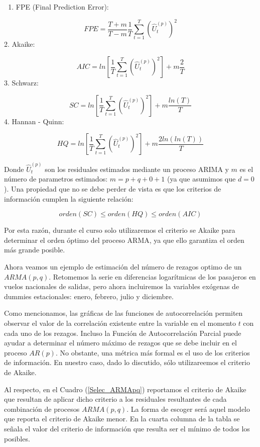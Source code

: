 \documentclass[
  a4paper,
]{article}
\providecommand{\tightlist}{%
  \setlength{\itemsep}{0pt}\setlength{\parskip}{0pt}}\usepackage{longtable,booktabs,array}
\begin{document}
\begin{enumerate}
\def\labelenumi{\arabic{enumi}.}
\tightlist
\item
  FPE (Final Prediction Error):
\end{enumerate}

\[
FPE = \frac{T+m}{T-m}\frac{1}{T}\sum_{t=1}^{T} \left( \hat{U}_t^{(p)} \right) ^2
\] 2. Akaike:

\[
AIC = ln \left[ \frac{1}{T} \sum_{t=1}^{T} \left( \hat{U}_t^{(p)} \right) ^2 \right] + m \frac{2}{T}
\] 3. Schwarz:

\[
SC = ln \left[ \frac{1}{T} \sum_{t=1}^{T} \left( \hat{U}_t^{(p)} \right) ^2 \right] + m \frac{ln(T)}{T}
\] 4. Hannan - Quinn:

\[
HQ = ln \left[ \frac{1}{T} \sum_{t=1}^{T} \left( \hat{U}_t^{(p)} \right) ^2 \right] + m \frac{2 ln(ln(T))}{T}
\]

Donde \(\hat{U}_t^{(p)}\) son los residuales estimados mediante un
proceso ARIMA y \(m\) es el número de parametros estimados:
\(m = p + q + 0 + 1\) (ya que asumimos que \(d = 0\)). Una propiedad que
no se debe perder de vista es que los criterios de información cumplen
la siguiente relación:

\[
orden(SC) \leq orden(HQ) \leq orden(AIC)
\]

Por esta razón, durante el curso solo utilizaremos el criterio se Akaike
para determinar el orden óptimo del proceso ARMA, ya que ello garantiza
el orden más grande posible.

Ahora veamos un ejemplo de estimación del número de rezagos optimo de un
\(ARMA(p, q)\). Retomemos la serie en diferencias logarítmicas de los
pasajeros en vuelos nacionales de salidas, pero ahora incluiremos la
variables exógenas de dummies estacionales: enero, febrero, julio y
diciembre.

Como mencionamos, las gráficas de las funciones de autocorrelación
permiten observar el valor de la correlación existente entre la variable
en el momento \(t\) con cada uno de los rezagos. Incluso la Función de
Autocorrelación Parcial puede ayudar a determinar el número máximo de
rezagos que se debe incluir en el proceso \(AR(p)\). No obstante, una
métrica más formal es el uso de los criterios de información. En nuestro
caso, dado lo discutido, sólo utilizareemos el criterio de Akaike.

Al respecto, en el Cuadro (\ref{Selec_ARMApq}) reportamos el criterio de
Akaike que resultan de aplicar dicho criterio a los residuales
resultantes de cada combinación de procesos \(ARMA(p, q)\). La forma de
escoger será aquel modelo que reporta el criterio de Akaike menor. En la
cuarta columna de la tabla se señala el valor del criterio de
información que resulta ser el mínimo de todos los posibles.
\end{document}
